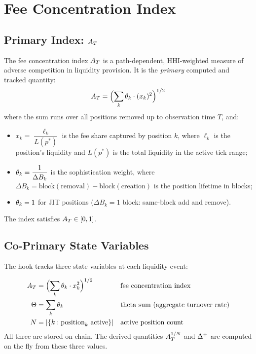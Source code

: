 
\section{Fee Concentration Index}\label{sec:fee-concentration-index}

\subsection{Primary Index: $A_T$}

The fee concentration index $A_T$ is a path-dependent, HHI-weighted measure of adverse competition
in liquidity provision. It is the \emph{primary} computed and tracked quantity:
\begin{equation}\label{eq:concentration-index}
  A_T = \Bigl(\sum_{k} \theta_k \cdot (x_k)^2 \Bigr)^{1/2}
\end{equation}
where the sum runs over all positions removed up to observation time $T$, and:
\begin{itemize}
  \item $x_k = \dfrac{\ell_k}{L(p^*)}$
        is the fee share captured by position $k$, where $\ell_k$ is the
        position's liquidity and $L(p^*)$ is the total liquidity in the
        active tick range;
  \item $\theta_k = \dfrac{1}{\Delta B_k}$
        is the sophistication weight, where $\Delta B_k = \text{block}(\text{removal}) - \text{block}(\text{creation})$
        is the position lifetime in blocks;
  \item $\theta_k = 1$ for JIT positions ($\Delta B_k = 1$ block: same-block add and remove).
\end{itemize}

The index satisfies $A_T \in [0,1]$.

\subsection{Co-Primary State Variables}

The hook tracks three state variables at each liquidity event:

\begin{definition}\label{def:co-primary}
\begin{align}
  A_T &= \Bigl(\sum_{k} \theta_k \cdot x_k^2 \Bigr)^{1/2}
    && \text{fee concentration index} \label{eq:at-state}\\
  \Theta &= \sum_{k} \theta_k
    && \text{theta sum (aggregate turnover rate)} \label{eq:theta-state}\\
  N &= |\{k : \text{position}_k \text{ active}\}|
    && \text{active position count} \label{eq:n-state}
\end{align}
All three are stored on-chain. The derived quantities $A_T^{1/N}$ and $\Delta^{+}$
are computed on the fly from these three values.
\end{definition}

